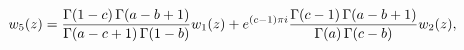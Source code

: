 \[w_{5}(z)=\frac{\mathop{\Gamma\/}\nolimits\!\left(1-c\right)\mathop{\Gamma\/}%
\nolimits\!\left(a-b+1\right)}{\mathop{\Gamma\/}\nolimits\!\left(a-c+1\right)%
\mathop{\Gamma\/}\nolimits\!\left(1-b\right)}w_{1}(z)+e^{(c-1)\pi i}\frac{%
\mathop{\Gamma\/}\nolimits\!\left(c-1\right)\mathop{\Gamma\/}\nolimits\!\left(%
a-b+1\right)}{\mathop{\Gamma\/}\nolimits\!\left(a\right)\mathop{\Gamma\/}%
\nolimits\!\left(c-b\right)}w_{2}(z),\]